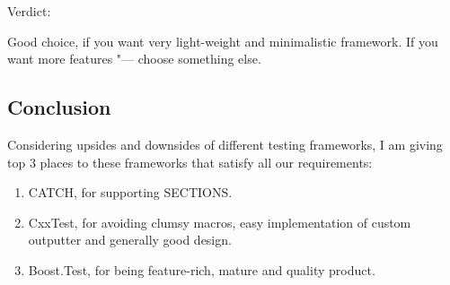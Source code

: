 \documentclass[10pt, a5paper]{article}
\begin{document}
Verdict:

Good choice, if you want very light-weight and minimalistic \linebreak framework. If you want more features "--- choose something else.

\subsection*{Conclusion}

Considering upsides and downsides of different testing frameworks, I am giving top 3 places to these frameworks that satisfy all our \linebreak requirements:

\begin{enumerate}
  \item CATCH, for supporting SECTIONS.
  \item CxxTest, for avoiding clumsy macros, easy implementation of custom outputter and generally good design.
  \item Boost.Test, for being feature-rich, mature and quality product.
\end{enumerate}
\end{document}
